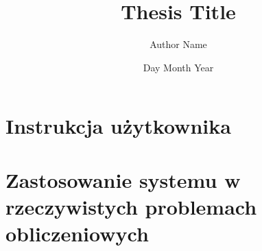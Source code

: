 \documentclass[12pt,twoside]{report}
\title{Thesis Title}
\author{Author Name}
\date{Day Month Year}
\begin{document}
	
	\tableofcontents	
	
	\chapter{Instrukcja użytkownika}
    

    \chapter{Zastosowanie systemu w rzeczywistych problemach obliczeniowych}
    

	
\end{document}
